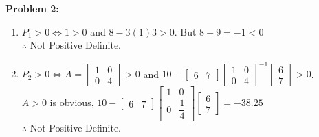 \documentclass[letterpaper]{article}
\begin{document}
\noindent \textbf{Problem 2:}
\begin{enumerate}
\setlength{\itemsep}{.1in}
\renewcommand{\labelenumi}{(\alph{enumi})}
\item  $P_1>0 \Leftrightarrow 1>0$ and $8-3(1)3>0$. But $8-9=-1<0$ \\[2ex]
$\therefore$ Not Positive Definite.

\item  $P_2>0 \Leftrightarrow A=\left[\begin{array}{rr} 1 & 0\\ 0 & 4\end{array} \right]>0$ and $10-\left[\begin{array}{rr}6&7\end{array}\right]\left[\begin{array}{rr} 1 & 0\\ 0 & 4\end{array} \right]^{-1}\left[\begin{array}{r} 6 \\7\end{array} \right]>0$. \\[2ex]
$A>0$ is obvious, $10-\left[\begin{array}{rr} 6&7\end{array} \right]\left[\begin{array}{cc} 1 & 0\\ 0 & \dfrac{1}{4}\end{array} \right]\left[\begin{array}{r} 6 \\7\end{array} \right]=-38.25$ \\[2ex]
$\therefore$ Not Positive Definite.


\end{enumerate}
\end{document}
